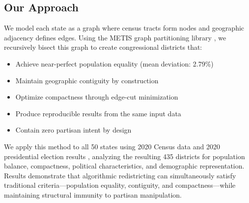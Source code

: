 \subsection{Our Approach}

We model each state as a graph where census tracts form nodes and geographic adjacency defines edges. Using the METIS graph partitioning library \cite{karypis1998fast}, we recursively bisect this graph to create congressional districts that:
\begin{itemize}
    \item Achieve near-perfect population equality (mean deviation: 2.79\%)
    \item Maintain geographic contiguity by construction
    \item Optimize compactness through edge-cut minimization
    \item Produce reproducible results from the same input data
    \item Contain zero partisan intent by design
\end{itemize}

We apply this method to all 50 states using 2020 Census data \cite{census2020redistricting} and 2020 presidential election results \cite{ansolabehere2012mecubed}, analyzing the resulting 435 districts for population balance, compactness, political characteristics, and demographic representation. Results demonstrate that algorithmic redistricting can simultaneously satisfy traditional criteria—population equality, contiguity, and compactness—while maintaining structural immunity to partisan manipulation.
